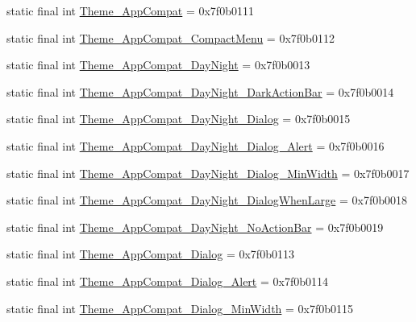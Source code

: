 \begin{CompactItemize}
static final int \hyperlink{classandroid_1_1support_1_1graphics_1_1drawable_1_1_r_1_1style_dfa70da3f2a4174f163ece89df3fc837}{Theme\_\-AppCompat} = 0x7f0b0111
\item 
static final int \hyperlink{classandroid_1_1support_1_1graphics_1_1drawable_1_1_r_1_1style_148762222649c29364ae179c1c565094}{Theme\_\-AppCompat\_\-CompactMenu} = 0x7f0b0112
\item 
static final int \hyperlink{classandroid_1_1support_1_1graphics_1_1drawable_1_1_r_1_1style_870ec75b065a2fe4da99694f6aa09e1d}{Theme\_\-AppCompat\_\-DayNight} = 0x7f0b0013
\item 
static final int \hyperlink{classandroid_1_1support_1_1graphics_1_1drawable_1_1_r_1_1style_587aaee39393b6952544c39a0417bbe0}{Theme\_\-AppCompat\_\-DayNight\_\-DarkActionBar} = 0x7f0b0014
\item 
static final int \hyperlink{classandroid_1_1support_1_1graphics_1_1drawable_1_1_r_1_1style_7b656f3b1767b4437d9ce0c8fa101874}{Theme\_\-AppCompat\_\-DayNight\_\-Dialog} = 0x7f0b0015
\item 
static final int \hyperlink{classandroid_1_1support_1_1graphics_1_1drawable_1_1_r_1_1style_eb0d36f76ba77427743c134c3b51b8e4}{Theme\_\-AppCompat\_\-DayNight\_\-Dialog\_\-Alert} = 0x7f0b0016
\item 
static final int \hyperlink{classandroid_1_1support_1_1graphics_1_1drawable_1_1_r_1_1style_1ec3d7fad40495a8d2f0a179069497d1}{Theme\_\-AppCompat\_\-DayNight\_\-Dialog\_\-MinWidth} = 0x7f0b0017
\item 
static final int \hyperlink{classandroid_1_1support_1_1graphics_1_1drawable_1_1_r_1_1style_7b33bce7078749d816e236c986ed6c20}{Theme\_\-AppCompat\_\-DayNight\_\-DialogWhenLarge} = 0x7f0b0018
\item 
static final int \hyperlink{classandroid_1_1support_1_1graphics_1_1drawable_1_1_r_1_1style_33b387a96324cd2a8f27f6f008dbb4ff}{Theme\_\-AppCompat\_\-DayNight\_\-NoActionBar} = 0x7f0b0019
\item 
static final int \hyperlink{classandroid_1_1support_1_1graphics_1_1drawable_1_1_r_1_1style_4fca6bdad33752989bb5bac5222c4b68}{Theme\_\-AppCompat\_\-Dialog} = 0x7f0b0113
\item 
static final int \hyperlink{classandroid_1_1support_1_1graphics_1_1drawable_1_1_r_1_1style_be203abd7f86d339f06a589dabfcc3bc}{Theme\_\-AppCompat\_\-Dialog\_\-Alert} = 0x7f0b0114
\item 
static final int \hyperlink{classandroid_1_1support_1_1graphics_1_1drawable_1_1_r_1_1style_ba7d822592c3286cc9c736e30831a6c3}{Theme\_\-AppCompat\_\-Dialog\_\-MinWidth} = 0x7f0b0115

\end{CompactItemize}
